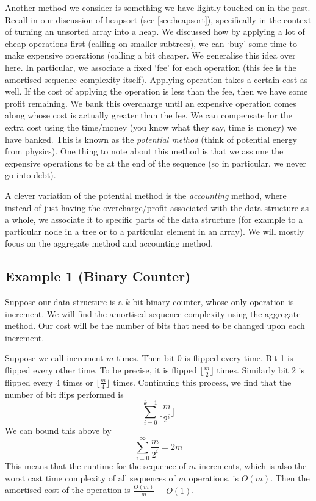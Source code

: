Another method we consider is something we have lightly touched on in the past. Recall in our discussion of heapsort (see \autoref{sec:heapsort}), specifically in the context of turning an unsorted array into a heap. We discussed how by applying a lot of cheap operations first (calling  on smaller subtrees), we can `buy' some time to make expensive operations (calling  a bit cheaper. We generalise this idea over here. In particular, we associate a fixed `fee' for each operation (this fee is the amortised sequence complexity itself). Applying operation takes a certain cost as well. If the cost of applying the operation is less than the fee, then we have some profit remaining. We bank this overcharge until an expensive operation comes along whose cost is actually greater than the fee. We can compensate for the extra cost using the time/money (you know what they say, time is money) we have banked. This is known as the \textit{potential method} (think of potential energy from physics). One thing to note about this method is that we assume the expensive operations to be at the end of the sequence (so in particular, we never go into debt).

A clever variation of the potential method is the \textit{accounting} method, where instead of just having the overcharge/profit associated with the data structure as a whole, we associate it to specific parts of the data structure (for example to a particular node in a tree or to a particular element in an array). We will mostly focus on the aggregate method and accounting method.

\subsection{Example 1 (Binary Counter)}\label{sec:binary-agg}
Suppose our data structure is a $k$-bit binary counter, whose only operation is increment. We will find the amortised sequence complexity using the aggregate method. Our cost will be the number of bits that need to be changed upon each increment.

Suppose we call increment $m$ times. Then bit 0 is flipped every time. Bit 1 is flipped every other time. To be precise, it is flipped $
\lfloor \frac{m}{2} \rfloor$ times. Similarly bit 2 is flipped every 4 times or $\lfloor \frac{m}{4} \rfloor$ times. Continuing this process, we find that the number of bit flips performed is 
$$ \sum_{i = 0}^{k - 1} \bigg\lfloor \frac{m}{2^i} \bigg\rfloor $$
We can bound this above by
$$ \sum_{i = 0}^{\infty} \frac{m}{2^i} = 2m $$
This means that the runtime for the sequence of $m$ increments, which is also the worst cast time complexity of all sequences of $m$ operations, is $O(m)$. Then the amortised cost of the operation is $\frac{O(m)}{m} = O(1)$.

